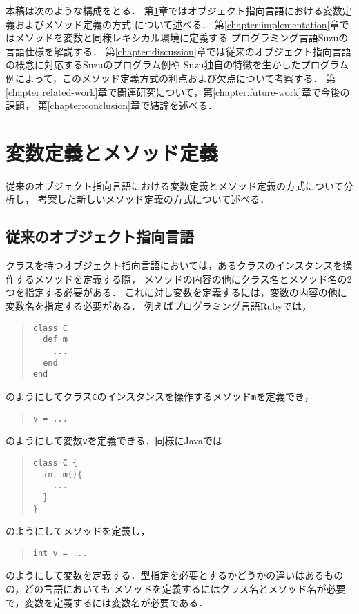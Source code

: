 \documentclass[a4paper,11pt,dvipdfmx]{jreport}
\begin{document}
本稿は次のような構成をとる．
第\ref{chapter:background}章ではオブジェクト指向言語における変数定義およびメソッド定義の方式
について述べる．
第\ref{chapter:implementation}章ではメソッドを変数と同様レキシカル環境に定義する
プログラミング言語Suzuの言語仕様を解説する．
第\ref{chapter:discussion}章では従来のオブジェクト指向言語の概念に対応するSuzuのプログラム例や
Suzu独自の特徴を生かしたプログラム例によって，このメソッド定義方式の利点および欠点について考察する．
第\ref{chapter:related-work}章で関連研究について，第\ref{chapter:future-work}章で今後の課題，
第\ref{chapter:conclusion}章で結論を述べる．


\chapter{変数定義とメソッド定義}
\label{chapter:background}

従来のオブジェクト指向言語における変数定義とメソッド定義の方式について分析し，
考案した新しいメソッド定義の方式について述べる．

\section{従来のオブジェクト指向言語}

クラスを持つオブジェクト指向言語においては，あるクラスのインスタンスを操作するメソッドを定義する際，
メソッドの内容の他にクラス名とメソッド名の2つを指定する必要がある．
これに対し変数を定義するには，変数の内容の他に変数名を指定する必要がある．
例えばプログラミング言語Rubyでは，
\begin{quote}
\begin{verbatim}
class C
  def m
    ...
  end
end
\end{verbatim}
\end{quote}
のようにしてクラス\verb|C|のインスタンスを操作するメソッド\verb|m|を定義でき，
\begin{quote}
\begin{verbatim}
v = ...
\end{verbatim}
\end{quote}
のようにして変数\verb|v|を定義できる．同様にJavaでは
\begin{quote}
\begin{verbatim}
class C {
  int m(){
    ...
  }
}
\end{verbatim}
\end{quote}
のようにしてメソッドを定義し，
\begin{quote}
\begin{verbatim}
int v = ...
\end{verbatim}
\end{quote}
のようにして変数を定義する．型指定を必要とするかどうかの違いはあるものの，どの言語においても
メソッドを定義するにはクラス名とメソッド名が必要で，変数を定義するには変数名が必要である．
\end{document}
